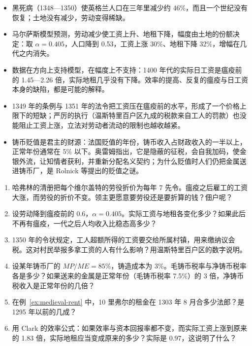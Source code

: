 \begin{takeaways}
\begin{itemize}
\item 黑死病（1348—1350）使英格兰人口在三年里减少约 46\%，而且一个世纪没有恢复；土地没有减少，劳动变得稀缺。
\item 马尔萨斯模型预测，劳动减少使工资上升、地租下降，幅度由土地的份额决定：取 $\alpha=0.405$，人口降到 0.53，工资上涨 30\%、地租下降 32\%，增幅在几代之内消失。
\item 数据在方向上支持模型，在幅度上不支持：1400 年代的实际日工资是瘟疫前的 1.45—2.26 倍，实际地租几乎没有下降。效率的提高、反复的瘟疫与日工资本身的缺陷，都是可能的解释。
\item 1349 年的条例与 1351 年的法令把工资压在瘟疫前的水平，形成了一个价格上限下的短缺；严厉的执行（温斯特里百户区九成的税款来自工人的罚款）也没能阻止工资上涨，立法对劳动者流动的限制也越收越紧。
\item 铸币贬值是君主的财源：法国贬值的年份，铸币收入占财政收入的一半以上，正常年份通常在 5\% 以下。奥雷姆指出，它是隐蔽的征税，会自我加码，使金银外流，让知情者获利，并重新分配名义契约；为什么贬值时人们仍把金属送进铸币厂，是 Rolnick 等提出的贬值之谜。
\end{itemize}
\end{takeaways}

\begin{selfcheck}
\begin{enumerate}
\item 哈弗林的清册把每个维尔盖特的劳役折价为每年 7 先令。瘟疫之后雇工的工资大涨，而劳役的折价不变。领主更愿意要劳役还是要折算的钱？佃户呢？
\item 设劳动降到瘟疫前的 0.6，$\alpha=0.405$。实际工资与地租各变化多少？如果此后不再有瘟疫，一代之后人均收入比稳态高多少？
\item 1350 年的令状规定，工人超额所得的工资要交给所属村镇，用来缴纳议会税。这对村民举报多拿工资的人有什么影响？用温斯特里百户区的数字说明。
\item 设某年铸币厂的 $MP/ME=85\%$，铸造成本为 3\%。毛铸币税率与净铸币税率各是多少？如果送来的金属是正常年份（毛铸币税率 7.5\%）的 3 倍，净铸币税收入是正常年份的几倍？
\item 在例~\ref{ex:medieval-rent} 中，10 里弗尔的租金在 1303 年 8 月合多少法郎？是 1295 年以前的几成？
\item 用 Clark 的效率公式：如果效率与资本回报率都不变，而实际工资上涨到原来的 1.83 倍，实际地租应当变成原来的多少？实际是 0.97，这说明了什么？
\end{enumerate}
\end{selfcheck}

